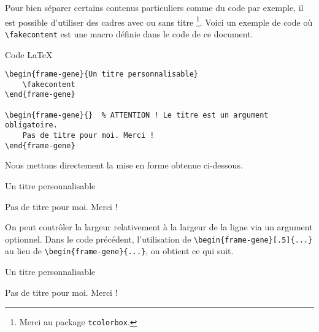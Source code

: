 Pour bien séparer certains contenus particuliers comme du code par exemple, il est possible d'utiliser des cadres avec ou sans titre
\footnote{
    Merci au package \texttt{tcolorbox}.
}.
Voici un exemple de code où \verb+\fakecontent+ est une macro définie dans le code de ce document.

\begin{frame-gene}{Code \LaTeX}
\small
\begin{verbatim}
\begin{frame-gene}{Un titre personnalisable}
    \fakecontent
\end{frame-gene}

\begin{frame-gene}{}  % ATTENTION ! Le titre est un argument obligatoire.
    Pas de titre pour moi. Merci !
\end{frame-gene}
\end{verbatim}
\end{frame-gene}


\medskip


Nous mettons directement la mise en forme obtenue ci-dessous.

\begin{frame-gene}{Un titre personnalisable}
    \fakecontent
\end{frame-gene}

\begin{frame-gene}{}
    Pas de titre pour moi. Merci !
\end{frame-gene}


\medskip

On peut contrôler la largeur relativement à la largeur de la ligne via un argument optionnel. Dans le code précédent, l'utilisation de \verb+\begin{frame-gene}[.5]{...}+ au lieu de \verb+\begin{frame-gene}{...}+, on obtient ce qui suit.

\begin{frame-gene}[.5]{Un titre personnalisable}
    \fakecontent
\end{frame-gene}

\begin{frame-gene}[.5]{}
    Pas de titre pour moi. Merci !
\end{frame-gene}
